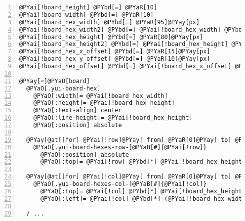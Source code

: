 \begin{Verbatim}[commandchars=@\[\],numbers=left,firstnumber=1,stepnumber=1]
@PYai[!board_height] @PYbd[=] @PYaR[10]
@PYai[!board_width] @PYbd[=] @PYaR[10]
@PYai[!board_hex_width] @PYbd[=] @PYaR[95]@PYay[px]
@PYai[!board_hex_width2] @PYbd[=] @PYai[!board_hex_width] @PYbd[/] @PYaR[2]
@PYai[!board_hex_height] @PYbd[=] @PYaR[80]@PYay[px]
@PYai[!board_hex_height2] @PYbd[=] @PYai[!board_hex_height] @PYbd[/] @PYaR[2]
@PYai[!board_hex_x_offset] @PYbd[=] @PYaR[15]@PYay[px]
@PYai[!board_hex_y_offset] @PYbd[=] @PYaR[10]@PYay[px]
@PYai[!board_hex_offset] @PYbd[=] @PYai[!board_hex_x_offset] @PYbd[+] @PYai[!board_hex_y_offset]

@PYay[=]@PYaO[board]
  @PYaO[.yui-board-hex]
    @PYaQ[:width]= @PYai[!board_hex_width]
    @PYaQ[:height]= @PYai[!board_hex_height]
    @PYaQ[:text-align] center
    @PYaQ[:line-height]= @PYai[!board_hex_height]
    @PYaQ[:position] absolute

  @PYay[@at[]for] @PYai[!row]@PYay[ from] @PYaR[0]@PYay[ to] @PYai[!board_height] @PYbd[+] @PYaR[1]
    @PYaO[.yui-board-hexes-row-]@PYaB[#]{@PYai[!row]}
      @PYaQ[:position] absolute
      @PYaQ[:top]= @PYai[!row] @PYbd[*] @PYai[!board_hex_height]

  @PYay[@at[]for] @PYai[!col]@PYay[ from] @PYaR[0]@PYay[ to] @PYai[!board_width] @PYbd[+] @PYaR[1]
    @PYaO[.yui-board-hexes-col-]@PYaB[#]{@PYai[!col]}
      @PYaQ[:top]= @PYai[!col] @PYbd[*] @PYai[!board_hex_height2]
      @PYaQ[:left]= @PYai[!col] @PYbd[*] (@PYai[!board_hex_width] @PYbd[-] @PYai[!board_hex_offset])

  / ...
\end{Verbatim}
